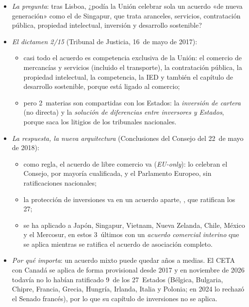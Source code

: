 \documentclass[11pt]{article}
\begin{document}
\begin{itemize}
\item \emph{La pregunta}: tras Lisboa, ¿podía la Unión celebrar sola un acuerdo «de nueva generación» como el de Singapur, que trata aranceles, servicios, contratación pública, propiedad intelectual, inversión y desarrollo sostenible?
\item \emph{El dictamen 2/15} (Tribunal de Justicia, 16~de mayo de 2017)\nocite{TJUE2017Dictamen215}:
  \begin{itemize}
  \item casi todo el acuerdo es competencia exclusiva de la Unión: el comercio de mercancías y servicios (incluido el transporte), la contratación pública, la propiedad intelectual, la competencia, la IED y también el capítulo de desarrollo sostenible, porque está ligado al comercio;
  \item pero 2~materias son compartidas con los Estados: la \emph{inversión de cartera} (no directa) y la \emph{solución de diferencias entre inversores y Estados}, porque saca los litigios de los tribunales nacionales.
  \end{itemize}
\item \emph{La respuesta, la nueva arquitectura} (Conclusiones del Consejo del 22~de mayo de 2018)\nocite{Consejo2018Arquitectura}:
  \begin{itemize}
  \item como regla, el acuerdo de libre comercio va  (\emph{EU-only}): lo celebran el Consejo, por mayoría cualificada, y el Parlamento Europeo, sin ratificaciones nacionales;
  \item la protección de inversiones va en un acuerdo aparte, , que ratifican los 27;
  \item se ha aplicado a Japón, Singapur, Vietnam, Nueva Zelanda, Chile, México y el Mercosur, en estos 3~últimos con un \emph{acuerdo comercial interino} que se aplica mientras se ratifica el acuerdo de asociación completo.
  \end{itemize}
\item \emph{Por qué importa}: un acuerdo mixto puede quedar años a medias. El CETA con Canadá se aplica de forma provisional desde 2017 y en noviembre de 2026 todavía no lo habían ratificado 9~de los 27~Estados (Bélgica, Bulgaria, Chipre, Francia, Grecia, Hungría, Irlanda, Italia y Polonia; en 2024 lo rechazó el Senado francés), por lo que su capítulo de inversiones no se aplica\nocite{CE2026CETA}.
\end{itemize}
\end{document}

